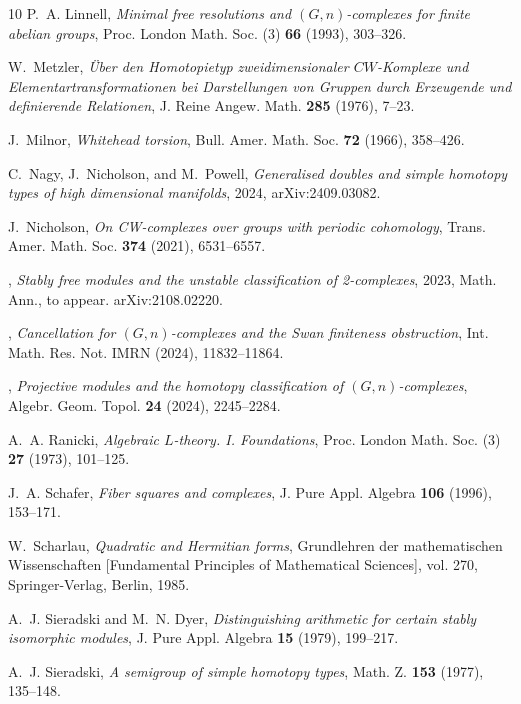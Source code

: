 \documentclass[11pt,a4paper,leqno]{amsart}
\theoremstyle{definition}
\theoremstyle{remark}
\begin{document}
\begin{thebibliography}{10}
P.~A. Linnell, \emph{Minimal free resolutions and {$(G,n)$}-complexes for
  finite abelian groups}, Proc. London Math. Soc. (3) \textbf{66} (1993),
  303--326.

W.~Metzler, \emph{\"{U}ber den {H}omotopietyp zweidimensionaler
  {$CW$}-{K}omplexe und {E}lementartransformationen bei {D}arstellungen von
  {G}ruppen durch {E}rzeugende und definierende {R}elationen}, J. Reine Angew.
  Math. \textbf{285} (1976), 7--23.

J.~Milnor, \emph{Whitehead torsion}, Bull. Amer. Math. Soc. \textbf{72} (1966),
  358--426.

C.~Nagy, J.~Nicholson, and M.~Powell, \emph{Generalised doubles and simple
  homotopy types of high dimensional manifolds}, 2024, arXiv:2409.03082.

J.~Nicholson, \emph{On {CW}-complexes over groups with periodic cohomology},
  Trans. Amer. Math. Soc. \textbf{374} (2021), 6531--6557.

\bysame, \emph{Stably free modules and the unstable classification of
  2-complexes}, 2023, Math. Ann., to appear. arXiv:2108.02220.

\bysame, \emph{Cancellation for {$(G,n)$}-complexes and the {S}wan finiteness
  obstruction}, Int. Math. Res. Not. IMRN (2024), 11832--11864.

\bysame, \emph{Projective modules and the homotopy classification of
  {$(G,n)$}-complexes}, Algebr. Geom. Topol. \textbf{24} (2024), 2245--2284.

A.~A. Ranicki, \emph{Algebraic {$L$}-theory. {I}. {F}oundations}, Proc. London
  Math. Soc. (3) \textbf{27} (1973), 101--125.

J.~A. Schafer, \emph{Fiber squares and complexes}, J. Pure Appl. Algebra
  \textbf{106} (1996), 153--171.

W.~Scharlau, \emph{Quadratic and {H}ermitian forms}, Grundlehren der
  mathematischen Wissenschaften [Fundamental Principles of Mathematical
  Sciences], vol. 270, Springer-Verlag, Berlin, 1985.

A.~J. Sieradski and M.~N. Dyer, \emph{Distinguishing arithmetic for certain
  stably isomorphic modules}, J. Pure Appl. Algebra \textbf{15} (1979),
  199--217.

A.~J. Sieradski, \emph{A semigroup of simple homotopy types}, Math. Z.
  \textbf{153} (1977), 135--148.


\end{thebibliography}
\end{document}
